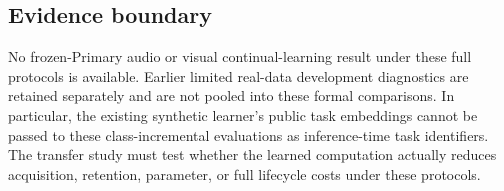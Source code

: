 \subsection{Evidence boundary}
No frozen-Primary audio or visual continual-learning result under these full
protocols is available. Earlier limited real-data development diagnostics are
retained separately and are not pooled into these formal comparisons.
In particular, the existing synthetic learner's public task embeddings cannot be
passed to these class-incremental evaluations as inference-time task identifiers.
The transfer study must test whether the learned computation actually reduces
acquisition, retention, parameter, or full lifecycle costs under these protocols.
